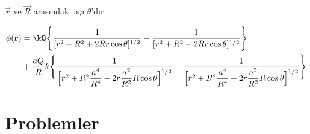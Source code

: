 \begin{theorem}
$\vec{r}$ ve $\vec{R}$ arasındaki açı $\theta$'dır.

\begin{align*}
\phi(\vec{r}) &= \kQ \Bigg\{ \dfrac{1}{[ r^{2} + R^{2} + 2Rr \cos \theta]^{1/2}} - \dfrac{1}{[ r^{2} + R^{2} - 2Rr \cos \theta]^{1/2}} \Bigg\} \\ 
&+ \dfrac{aQ}{R} k  \Bigg\{ \dfrac{1}{ \Big[ r^{2} + R^{2}  \dfrac{a^{4}}{R^{4}} - 2r \dfrac{a^{2}}{R^{2}} R \cos \theta \Big]^{1/2}} - \dfrac{1}{ \Big[ r^{2} + R^{2}   \dfrac{a^{4}}{R^{4}} + 2r \dfrac{a^{2}}{R^{2}} R \cos \theta \Big]^{1/2}} \Bigg\} 
\end{align*}

\end{theorem}
\section{Problemler}